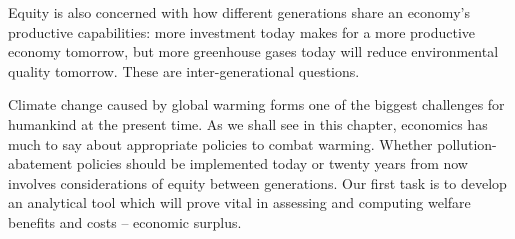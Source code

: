 Equity is also concerned with how different generations share an economy's productive capabilities: more investment today makes for a more productive economy tomorrow, but more greenhouse gases today will reduce environmental quality tomorrow. These are inter-generational questions. 

Climate change caused by global warming forms one of the biggest challenges for humankind at the present time. As we shall see in this chapter, economics has much to say about appropriate policies to combat warming. Whether pollution-abatement policies should be implemented today or twenty years from now involves considerations of equity between generations. Our first task is to develop an analytical tool which will prove vital in assessing and computing welfare benefits and costs -- economic surplus.